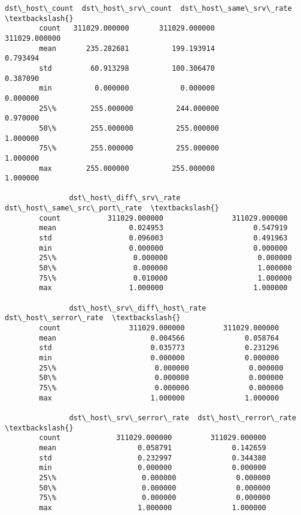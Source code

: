 \documentclass[11pt]{article}
\begin{document}
\begin{Verbatim}[commandchars=\\\{\}]
               dst\_host\_count  dst\_host\_srv\_count  dst\_host\_same\_srv\_rate  \textbackslash{}
        count   311029.000000       311029.000000           311029.000000   
        mean       235.282681          199.193914                0.793494   
        std         60.913298          100.306470                0.387090   
        min          0.000000            0.000000                0.000000   
        25\%        255.000000          244.000000                0.970000   
        50\%        255.000000          255.000000                1.000000   
        75\%        255.000000          255.000000                1.000000   
        max        255.000000          255.000000                1.000000   
        
               dst\_host\_diff\_srv\_rate  dst\_host\_same\_src\_port\_rate  \textbackslash{}
        count           311029.000000                311029.000000   
        mean                 0.024953                     0.547919   
        std                  0.096003                     0.491963   
        min                  0.000000                     0.000000   
        25\%                  0.000000                     0.000000   
        50\%                  0.000000                     1.000000   
        75\%                  0.010000                     1.000000   
        max                  1.000000                     1.000000   
        
               dst\_host\_srv\_diff\_host\_rate  dst\_host\_serror\_rate  \textbackslash{}
        count                311029.000000         311029.000000   
        mean                      0.004566              0.058764   
        std                       0.035773              0.231296   
        min                       0.000000              0.000000   
        25\%                       0.000000              0.000000   
        50\%                       0.000000              0.000000   
        75\%                       0.000000              0.000000   
        max                       1.000000              1.000000   
        
               dst\_host\_srv\_serror\_rate  dst\_host\_rerror\_rate  \textbackslash{}
        count             311029.000000         311029.000000   
        mean                   0.058791              0.142659   
        std                    0.232997              0.344380   
        min                    0.000000              0.000000   
        25\%                    0.000000              0.000000   
        50\%                    0.000000              0.000000   
        75\%                    0.000000              0.000000   
        max                    1.000000              1.000000   
        

\end{Verbatim}
\end{document}

